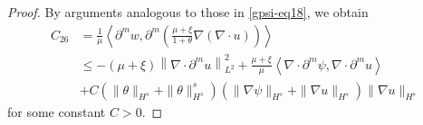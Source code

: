 \documentclass[10pt,a4paper]{amsart}
\begin{document}
\begin{proof}
By arguments analogous to those in \eqref{gpsi-eq18}, we obtain
\begin{equation}\label{gpsi-eq20}
\begin{aligned}
C_{26}&=\frac{1}{\mu} \left\langle \partial^m w, \partial^m \left( \frac{\mu+\xi}{1+\theta} \nabla (\nabla \cdot u) \right) \right\rangle \\&
\leq -\left( \mu+\xi \right) \left\| \nabla \cdot \partial^m u \right\|_{L^2}^2 + \frac{\mu+\xi}{\mu} \left\langle \nabla \cdot \partial^m \psi, \nabla \cdot \partial^m u \right\rangle  \\&
+  C\left( \| \theta \|_{H^s} + \| \theta \|_{H^s}^s \right) \left( \| \nabla \psi \|_{H^s} + \| \nabla u \|_{H^s} \right) \| \nabla u \|_{H^s}  
\end{aligned}
\end{equation}
for some constant $C > 0$.


\end{proof}
\end{document}
